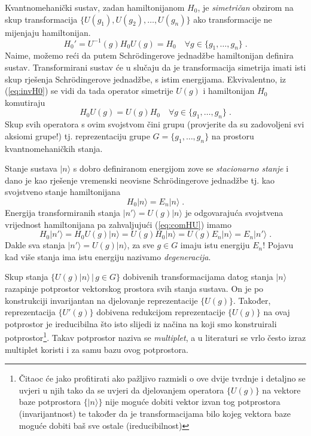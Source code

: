 Kvantnomehanički sustav, zadan
hamiltonijanom $H_0$, je \emph{simetričan} obzirom na skup transformacija
$\{ U(g_1), U(g_2), \ldots, U(g_n)\}$ ako transformacije ne mijenjaju
hamiltonijan. 
\begin{equation}
    H_{0}' = U^{-1}(g) H_{0} U(g) = H_{0} \quad \forall  g \in \{g_1,\ldots, g_n\}\;.
 \label{eq:invH0}
\end{equation}
Naime, možemo reći da putem Schr\"{o}dingerove jednadžbe 
hamiltonijan definira sustav. Transformirani sustav će u slučaju da
je transformacija simetrija imati isti skup rješenja Schr\"{o}dingerove jednadžbe,
s istim energijama.
Ekvivalentno, iz (\ref{eq:invH0}) se vidi da tada operator
simetrije $U(g)$ i hamiltonijan $H_0$ komutiraju
\begin{equation}
  H_{0}U(g)=U(g)H_0 \quad \forall  g \in \{g_1,\ldots, g_n\} \;.
  \label{eq:comHU}
\end{equation}
Skup svih operatora s ovim svojstvom čini grupu (provjerite da su
zadovoljeni svi aksiomi grupe!) tj.
reprezentaciju grupe $G=\{g_1,\ldots, g_n\}$ na prostoru kvantnomehaničkih 
stanja.

Stanje sustava $|n\rangle$ s dobro definiranom energijom  zove se
\emph{stacionarno stanje} i dano je kao rješenje vremenski 
neovisne Schr\"{o}dingerove jednadžbe tj. kao svojstveno stanje hamiltonijana
\begin{displaymath}
  H_0 |n\rangle = E_n | n \rangle \;.
\end{displaymath}
Energija transformiranih stanja $|n'\rangle = U(g)|n\rangle$ je
odgovarajuća svojstvena vrijednost hamiltonijana pa zahvaljujući
(\ref{eq:comHU}) imamo
\begin{displaymath}
  H_0 |n'\rangle = H_0 U(g)|n\rangle = U(g) H_0 |n\rangle =
 U(g) E_n |n\rangle = E_n |n'\rangle \;.
\end{displaymath}
Dakle sva stanja $|n'\rangle = U(g)|n\rangle$, za sve $g\in G$ imaju
istu energiju $E_n$! Pojavu kad više stanja ima istu energiju 
nazivamo \emph{degeneracija}. 

Skup stanja $\{U(g)|n \rangle \,|\, g\in G\}$ dobivenih transformacijama
datog stanja $|n\rangle$ razapinje
potprostor vektorskog prostora svih stanja sustava. On je
po konstrukciji invarijantan na djelovanje reprezentacije $\{ U(g) \}$.
Također, reprezentacija $\{ U'(g) \}$ dobivena redukcijom reprezentacije
$\{ U(g) \}$ na ovaj potprostor je ireducibilna što isto slijedi
iz načina na koji smo konstruirali potprostor\footnote{Čitaoc će jako
profitirati ako pažljivo razmisli o ove dvije tvrdnje i detaljno se
uvjeri u njih tako da se uvjeri da djelovanjem operatora $\{ U(g) \}$
na vektore baze potprostora $\{|n \rangle \}$ nije moguće
dobiti vektor izvan tog potprostora (invarijantnost) te također da
je transformacijama bilo kojeg vektora baze moguće dobiti baš sve
ostale (ireducibilnost)}.
Takav potprostor naziva se \emph{multiplet}, a u literaturi se
vrlo često izraz multiplet koristi i za samu bazu ovog potprostora.

